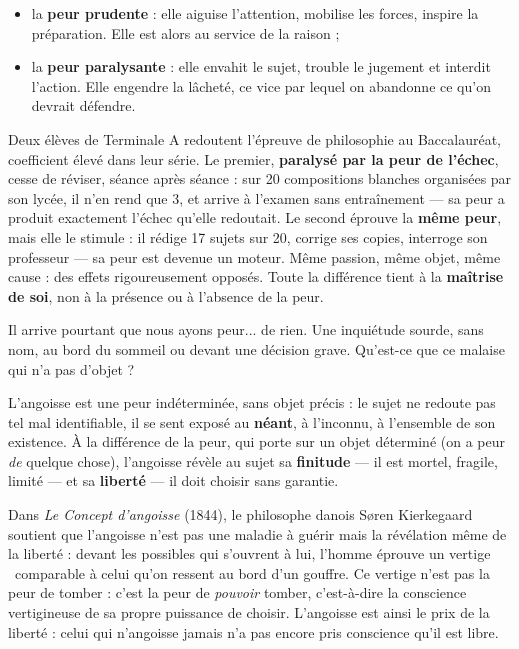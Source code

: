 \documentclass[11pt]{article}
\newcommand{\cle}[1]{{\popxbold\color{popdark}#1}}
\newcounter{popsec}
\newcounter{popsub}
\newcommand{\courssub}[1]{%
  \stepcounter{popsub}%
  \par\vspace{9pt}\noindent{\popxbold\fontsize{11.5}{13}\selectfont\color{popink}{\color{poporange}\thepopsec.\thepopsub}\hspace{6pt}#1}\par\nopagebreak\vspace{4pt}
}
\begin{document}
\begin{itemize}
\item la \textbf{peur prudente} : elle aiguise l'attention, mobilise les forces, inspire la préparation. Elle est alors au service de la raison ;
\item la \textbf{peur paralysante} : elle envahit le sujet, trouble le jugement et interdit l'action. Elle engendre la \cle{lâcheté}, ce vice par lequel on abandonne ce qu'on devrait défendre.
\end{itemize}

\begin{exemplebox}
Deux élèves de Terminale A redoutent l'épreuve de philosophie au Baccalauréat, coefficient élevé dans leur série. Le premier, \textbf{paralysé par la peur de l'échec}, cesse de réviser, séance après séance : sur 20 compositions blanches organisées par son lycée, il n'en rend que 3, et arrive à l'examen sans entraînement — sa peur a produit exactement l'échec qu'elle redoutait. Le second éprouve la \textbf{même peur}, mais elle le stimule : il rédige 17 sujets sur 20, corrige ses copies, interroge son professeur — sa peur est devenue un moteur. Même passion, même objet, même cause : des effets rigoureusement opposés. Toute la différence tient à la \textbf{maîtrise de soi}, non à la présence ou à l'absence de la peur.
\end{exemplebox}

\courssub{L'angoisse : la peur sans objet}

Il arrive pourtant que nous ayons peur... de rien. Une inquiétude sourde, sans nom, au bord du sommeil ou devant une décision grave. Qu'est-ce que ce malaise qui n'a pas d'objet ?

\begin{definition}[L'angoisse]
L'\cle{angoisse} est une peur indéterminée, sans objet précis : le sujet ne redoute pas tel mal identifiable, il se sent exposé au \textbf{néant}, à l'inconnu, à l'ensemble de son existence. À la différence de la peur, qui porte sur un objet déterminé (on a peur \emph{de} quelque chose), l'angoisse révèle au sujet sa \textbf{finitude} — il est mortel, fragile, limité — et sa \textbf{liberté} — il doit choisir sans garantie.
\end{definition}

\begin{propriete}
Dans \emph{Le Concept d'angoisse} (1844), le philosophe danois Søren Kierkegaard soutient que l'angoisse n'est pas une maladie à guérir mais la révélation même de la liberté : devant les possibles qui s'ouvrent à lui, l'homme éprouve un \guillemotleft vertige \guillemotright\ comparable à celui qu'on ressent au bord d'un gouffre. Ce vertige n'est pas la peur de tomber : c'est la peur de \emph{pouvoir} tomber, c'est-à-dire la conscience vertigineuse de sa propre puissance de choisir. L'angoisse est ainsi le prix de la liberté : celui qui n'angoisse jamais n'a pas encore pris conscience qu'il est libre.
\end{propriete}
\end{document}
